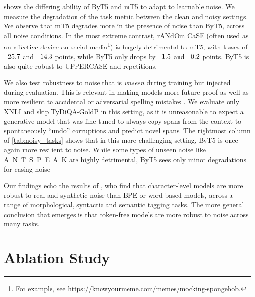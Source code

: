 \documentclass[11pt,a4paper]{article}
\newcommand{\minus}{\scalebox{0.7}[1.0]{$-$}}
\begin{document}
 shows the differing ability of ByT5 and mT5 to adapt to learnable noise. We measure the degradation of the task metric between the clean and noisy settings. We observe that mT5 degrades more in the presence of noise than ByT5, across all noise conditions. In the most extreme contrast, rANdOm CaSE (often used as an affective device on social media\footnote{For example, see \url{https://knowyourmeme.com/memes/mocking-spongebob}.}) is hugely detrimental to mT5, with losses of $\minus25.7$ and $\minus14.3$ points, while ByT5 only drops by $\minus1.5$ and $\minus0.2$ points. ByT5 is also quite robust to UPPERCASE and repetitions.

We also test robustness to noise that is \emph{unseen} during training but injected during evaluation. This is relevant in making models more future-proof as well as more resilient to accidental or adversarial spelling mistakes \cite{pruthi-etal-2019-combating, sun-2020-adv-bert}. We evaluate only XNLI and skip TyDiQA-GoldP in this setting, as it is unreasonable to expect a generative model that was fine-tuned to always copy spans from the context to spontaneously ``undo'' corruptions and predict novel spans. The rightmost column of \cref{tab:noisy_tasks} shows that in this more challenging setting, ByT5 is once again more resilient to noise. While some types of unseen noise like A~N~T~S~P~E~A~K are highly detrimental, ByT5 sees only minor degradations for casing noise.

Our findings echo the results of \citet{durrani-etal-2019-one}, who find that character-level models are more robust to real and synthetic noise than BPE or word-based models, across a range of morphological, syntactic and semantic tagging tasks. The more general conclusion that emerges is that token-free models are more robust to noise across many tasks.

\section{Ablation Study}
\label{sec:ablations}
\end{document}
